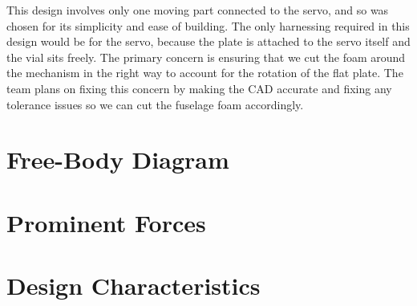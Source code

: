     This design involves only one moving part connected to the servo, and so was chosen for its simplicity and ease of building. The only harnessing required in this design would be for the servo, because the plate is attached to the servo itself and the vial sits freely. The primary concern is ensuring that we cut the foam around the mechanism in the right way to account for the rotation of the flat plate. The team plans on fixing this concern by making the CAD accurate and fixing any tolerance issues so we can cut the fuselage foam accordingly.
    
\section{Free-Body Diagram}

\section{Prominent Forces}

\section{Design Characteristics}

